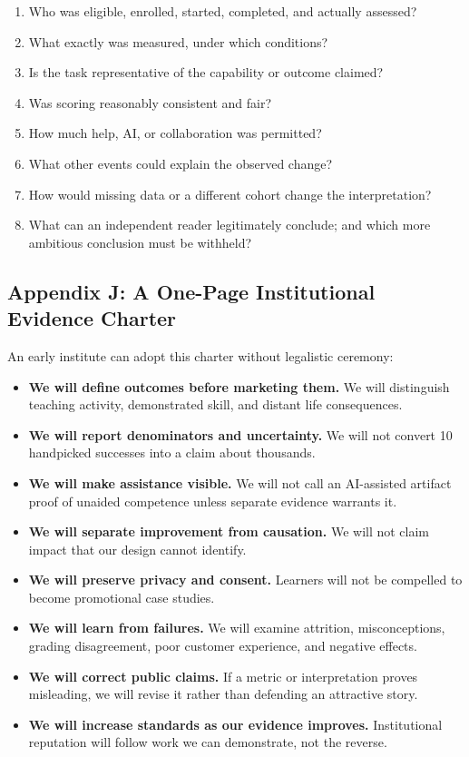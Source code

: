 \begin{enumerate}[leftmargin=2em, itemsep=0.4em]
    \item Who was eligible, enrolled, started, completed, and actually assessed?
    \item What exactly was measured, under which conditions?
    \item Is the task representative of the capability or outcome claimed?
    \item Was scoring reasonably consistent and fair?
    \item How much help, AI, or collaboration was permitted?
    \item What other events could explain the observed change?
    \item How would missing data or a different cohort change the interpretation?
    \item What can an independent reader legitimately conclude; and which more ambitious conclusion must be withheld?
\end{enumerate}

\subsection*{Appendix J: A One-Page Institutional Evidence Charter}

An early institute can adopt this charter without legalistic ceremony:

\begin{itemize}[leftmargin=1.5em, itemsep=0.5em]
    \item \textbf{We will define outcomes before marketing them.} We will distinguish teaching activity, demonstrated skill, and distant life consequences.
    \item \textbf{We will report denominators and uncertainty.} We will not convert 10 handpicked successes into a claim about thousands.
    \item \textbf{We will make assistance visible.} We will not call an AI-assisted artifact proof of unaided competence unless separate evidence warrants it.
    \item \textbf{We will separate improvement from causation.} We will not claim impact that our design cannot identify.
    \item \textbf{We will preserve privacy and consent.} Learners will not be compelled to become promotional case studies.
    \item \textbf{We will learn from failures.} We will examine attrition, misconceptions, grading disagreement, poor customer experience, and negative effects.
    \item \textbf{We will correct public claims.} If a metric or interpretation proves misleading, we will revise it rather than defending an attractive story.
    \item \textbf{We will increase standards as our evidence improves.} Institutional reputation will follow work we can demonstrate, not the reverse.
\end{itemize}

